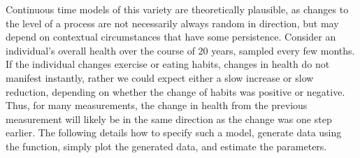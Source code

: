 \documentclass[nojss]{jss}\usepackage[]{graphicx}\usepackage[]{color}
\begin{document}
Continuous time models of this variety are theoretically plausible, as changes to the level of a process are not necessarily always random in direction, but may depend on contextual circumstances that have some persistence.  Consider an individual's overall health over the course of 20 years, sampled every few months.  If the individual changes exercise or eating habits, changes in health do not manifest instantly, rather we could expect either a slow increase or slow reduction, depending on whether the change of habits was positive or negative. Thus, for many measurements, the change in health from the previous measurement will likely be in the same direction as the change was one step earlier. The following details how to specify such a model, generate data using the  function, simply plot the generated data, and estimate the parameters.
\end{document}
